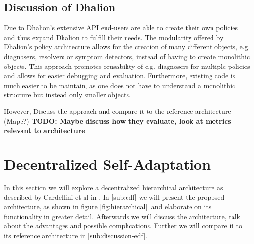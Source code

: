         \subsection{Discussion of Dhalion}
        \label{sub:dhalion-discussion}
        Due to Dhalion's extensive API end-users are able to create their own policies and thus expand Dhalion to fulfill their needs. 
        The modularity offered by Dhalion's policy architecture allows for the creation of many different objects, e.g. diagnosers, resolvers or symptom detectors, 
        instead of having to create monolithic objects.
        This approach promotes reusability of e.g. diagnosers for multiple policies and allows for easier debugging and evaluation.
        Furthermore, existing code is much easier to be maintain, as one does not have to understand a monolithic structure but instead only smaller objects.
        
        \quad However, 
        Discuss the approach and compare it to the reference architecture (Mape?)
        \textbf{TODO: Maybe discuss how they evaluate, look at metrics relevant to architecture}

    \section{Decentralized Self-Adaptation}
    \label{sec:hierarchical}
    In this section we will explore a decentralized hierarchical architecture as described by Cardellini et al in \cite{cardellini}.
    In \ref{sub:edf} we will present the proposed architecture, as shown in figure \ref{fig:hierarchical}, and elaborate on its functionality in greater detail.
    Afterwards we will discuss the architecture, talk about the advantages and possible complications. Further we will compare it to its reference architecture in \ref{sub:discussion-edf}.


